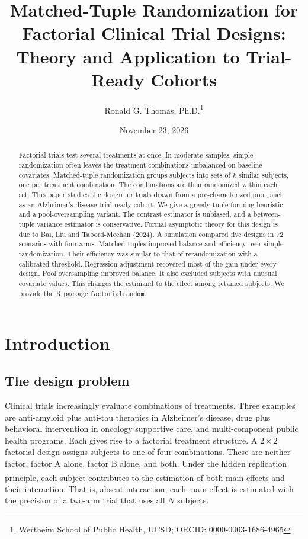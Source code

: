 \documentclass[
  11pt,
]{article}
\title{Matched-Tuple Randomization for Factorial Clinical Trial Designs: Theory and Application to Trial-Ready Cohorts}
\author{Ronald G. Thomas, Ph.D.\thanks{Wertheim School of Public Health, UCSD; ORCID: 0000-0003-1686-4965}}
\date{November 23, 2026}
\begin{document}
\maketitle
\begin{abstract}
Factorial trials test several treatments at once. In
moderate samples, simple randomization often leaves the
treatment combinations unbalanced on baseline covariates.
Matched-tuple randomization groups subjects into sets of \(k\)
similar subjects, one per treatment combination. The
combinations are then randomized within each set. This
paper studies the design for trials drawn from a
pre-characterized pool, such as an Alzheimer's disease
trial-ready cohort. We give a greedy tuple-forming heuristic
and a pool-oversampling variant. The contrast estimator is
unbiased, and a between-tuple variance estimator is
conservative. Formal asymptotic theory for this design is
due to Bai, Liu and Tabord-Meehan (2024). A simulation
compared five designs in 72 scenarios with four arms.
Matched tuples improved balance and efficiency over simple
randomization. Their efficiency was similar to that of
rerandomization with a calibrated threshold.
Regression adjustment recovered most of the gain under every
design. Pool oversampling improved balance. It also excluded
subjects with unusual covariate values. This changes the
estimand to the effect among retained subjects. We provide
the R package \texttt{factorialrandom}.
\end{abstract}

{
\setcounter{tocdepth}{2}
\tableofcontents
}
\section{Introduction}\label{introduction}

\subsection{The design problem}\label{the-design-problem}

Clinical trials increasingly evaluate combinations of
treatments. Three examples are anti-amyloid plus anti-tau
therapies in Alzheimer's disease, drug plus behavioral
intervention in oncology supportive care, and
multi-component public health programs. Each gives rise to
a factorial treatment structure. A \(2 \times 2\) factorial
design assigns subjects to one of four combinations. These
are neither factor, factor A alone, factor B alone, and
both. Under the hidden replication principle\textsuperscript{}, each subject contributes to
the estimation of both main effects and their interaction.
That is, absent interaction, each main effect is estimated
with the precision of a two-arm trial that uses all \(N\)
subjects.
\end{document}
